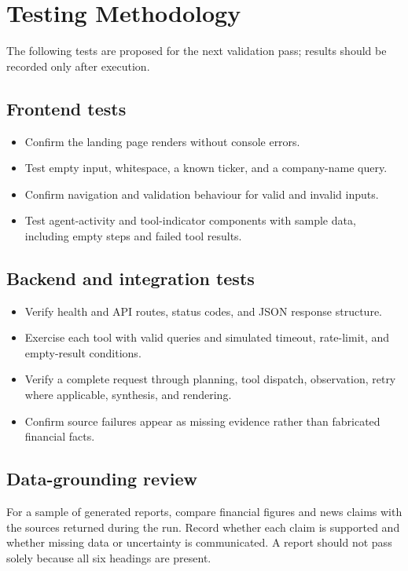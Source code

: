 \documentclass[12pt,a4paper,oneside]{report}
\begin{document}
\section{Testing Methodology}
The following tests are proposed for the next validation pass; results should be recorded only after execution.
\subsection{Frontend tests}
\begin{itemize}[leftmargin=*]
\item Confirm the landing page renders without console errors.
\item Test empty input, whitespace, a known ticker, and a company-name query.
\item Confirm navigation and validation behaviour for valid and invalid inputs.
\item Test agent-activity and tool-indicator components with sample data, including empty steps and failed tool results.
\end{itemize}
\subsection{Backend and integration tests}
\begin{itemize}[leftmargin=*]
\item Verify health and API routes, status codes, and JSON response structure.
\item Exercise each tool with valid queries and simulated timeout, rate-limit, and empty-result conditions.
\item Verify a complete request through planning, tool dispatch, observation, retry where applicable, synthesis, and rendering.
\item Confirm source failures appear as missing evidence rather than fabricated financial facts.
\end{itemize}
\subsection{Data-grounding review}
For a sample of generated reports, compare financial figures and news claims with the sources returned during the run. Record whether each claim is supported and whether missing data or uncertainty is communicated. A report should not pass solely because all six headings are present.
\end{document}
